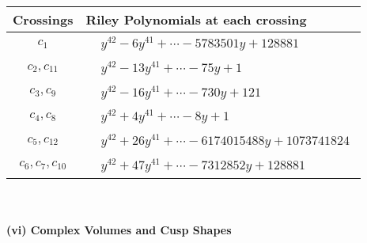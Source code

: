 \documentclass[1p]{elsarticle_modified}
\theoremstyle{definition}
\begin{document}
\begin{tabular}{m{50pt}|m{274pt}}
Crossings & \hspace{64pt}Riley Polynomials at each crossing \\
\hline $$\begin{aligned}c_{1}\end{aligned}$$&$\begin{aligned}
&y^{42}-6 y^{41}+\cdots-5783501 y+128881
\end{aligned}$\\
\hline $$\begin{aligned}c_{2},c_{11}\end{aligned}$$&$\begin{aligned}
&y^{42}-13 y^{41}+\cdots-75 y+1
\end{aligned}$\\
\hline $$\begin{aligned}c_{3},c_{9}\end{aligned}$$&$\begin{aligned}
&y^{42}-16 y^{41}+\cdots-730 y+121
\end{aligned}$\\
\hline $$\begin{aligned}c_{4},c_{8}\end{aligned}$$&$\begin{aligned}
&y^{42}+4 y^{41}+\cdots-8 y+1
\end{aligned}$\\
\hline $$\begin{aligned}c_{5},c_{12}\end{aligned}$$&$\begin{aligned}
&y^{42}+26 y^{41}+\cdots-6174015488 y+1073741824
\end{aligned}$\\
\hline $$\begin{aligned}c_{6},c_{7},c_{10}\end{aligned}$$&$\begin{aligned}
&y^{42}+47 y^{41}+\cdots-7312852 y+128881
\end{aligned}$\\
\hline
\end{tabular}\\~\\
\newpage\flushleft \textbf{(vi) Complex Volumes and Cusp Shapes}
\end{document}
